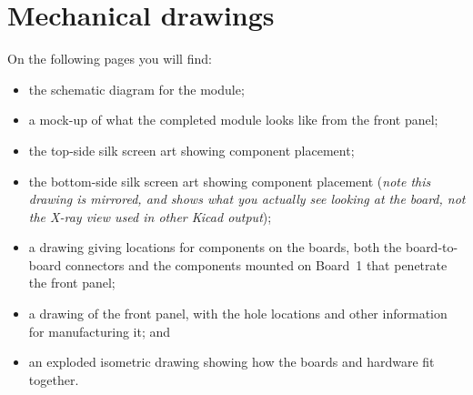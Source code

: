 
%
%
%
%
%
%

\chapter{Mechanical drawings}

On the following pages you will find:
\begin{itemize}
  \item the schematic diagram for the module;
  \item a mock-up of what the completed module looks like from the front
    panel;
  \item the top-side silk screen art showing component placement;
  \item the bottom-side silk screen art showing component placement
    (\emph{note this drawing is mirrored, and shows what you actually see
    looking at the board, not the X-ray view used in other Kicad output});
  \item a drawing giving locations for components on the boards, both the
    board-to-board connectors and the components mounted on Board~1 that
    penetrate the front panel;
  \item a drawing of the front panel, with the hole locations and other
    information for manufacturing it; and
  \item an exploded isometric drawing showing how the boards and hardware
    fit together.
\end{itemize}

\texdependspdfworkaround

\clearpage


\thispagestyle{empty}
\onecolumn
\vspace*{\fill}\begin{center}
\setlength{\fboxsep}{0pt}%
\setlength{\fboxrule}{1pt}%
\end{center}
\vspace*{\fill}

\clearpage




\clearpage\label{fig:exploded}

